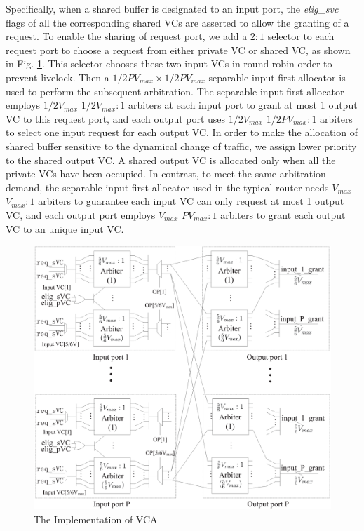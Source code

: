 \documentclass[paper]{ieice}
\begin{document}
Specifically, when a shared buffer is designated to an input port, the \emph{elig\_svc} flags of all the corresponding shared VCs are asserted to allow the granting of a request. To enable the sharing of request port, we add a $2:1$ selector to each request port to choose a request from either private VC or shared VC, as shown in Fig. \ref{vcallocator}. This selector chooses these two input VCs in round-robin order to prevent livelock. Then a $1/2PV_{max}\times 1/2PV_{max}$ separable input-first allocator \cite{DaTo04} is used to perform the subsequent arbitration. The separable input-first allocator employs $1/2V_{max}$ $1/2V_{max}:1$ arbiters at each input port to grant at most 1 output VC to this request port, and each output port uses $1/2V_{max}$ $1/2PV_{max}:1$ arbiters to select one input request for each output VC. In order to make the allocation of shared buffer sensitive to the dynamical change of traffic, we assign lower priority to the shared output VC. A shared output VC is allocated only when all the private VCs have been occupied. In contrast, to meet the same arbitration demand, the separable input-first allocator used in the typical router needs $V_{max}$ $V_{max}:1$ arbiters to guarantee each input VC can only request at most 1 output VC, and each output port employs $V_{max}$ $PV_{max}:1$ arbiters to grant each output VC to an unique input VC.
\begin{figure}[h]
\centering\includegraphics[scale=0.25]{figures/vcalloc.eps}
\caption{The Implementation of VCA}\label{vcallocator}
\end{figure}
\end{document}
